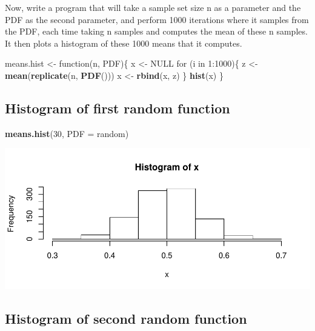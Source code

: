 \documentclass[]{article}
\newenvironment{Shaded}{\begin{snugshade}}{\end{snugshade}}
\newcommand{\KeywordTok}[1]{\textcolor[rgb]{0.13,0.29,0.53}{\textbf{{#1}}}}
\newcommand{\DataTypeTok}[1]{\textcolor[rgb]{0.13,0.29,0.53}{{#1}}}
\newcommand{\DecValTok}[1]{\textcolor[rgb]{0.00,0.00,0.81}{{#1}}}
\newcommand{\StringTok}[1]{\textcolor[rgb]{0.31,0.60,0.02}{{#1}}}
\newcommand{\OtherTok}[1]{\textcolor[rgb]{0.56,0.35,0.01}{{#1}}}
\newcommand{\NormalTok}[1]{{#1}}
\begin{document}
Now, write a program that will take a sample set size n as a parameter
and the PDF as the second parameter, and perform 1000 iterations where
it samples from the PDF, each time taking n samples and computes the
mean of these n samples. It then plots a histogram of these 1000 means
that it computes.

\begin{Shaded}
\begin{Highlighting}[]
\NormalTok{means.hist <-}\StringTok{ }\NormalTok{function(n, PDF)\{}
          \NormalTok{x <-}\StringTok{ }\OtherTok{NULL}
          \NormalTok{for (i in }\DecValTok{1}\NormalTok{:}\DecValTok{1000}\NormalTok{)\{}
           \NormalTok{z <-}\StringTok{ }\KeywordTok{mean}\NormalTok{(}\KeywordTok{replicate}\NormalTok{(n, }\KeywordTok{PDF}\NormalTok{()))}
           \NormalTok{x <-}\StringTok{ }\KeywordTok{rbind}\NormalTok{(x, z)}
          \NormalTok{\}}
          \KeywordTok{hist}\NormalTok{(x)}
\NormalTok{\}}
\end{Highlighting}
\end{Shaded}

\subsection{Histogram of first random
function}\label{histogram-of-first-random-function}

\begin{Shaded}
\begin{Highlighting}[]
\KeywordTok{means.hist}\NormalTok{(}\DecValTok{30}\NormalTok{, }\DataTypeTok{PDF =} \NormalTok{random)}
\end{Highlighting}
\end{Shaded}

\includegraphics{CHunt_Assign9_PS1_files/figure-latex/unnamed-chunk-6-1.pdf}

\newpage

\subsection{Histogram of second random
function}\label{histogram-of-second-random-function}
\end{document}
